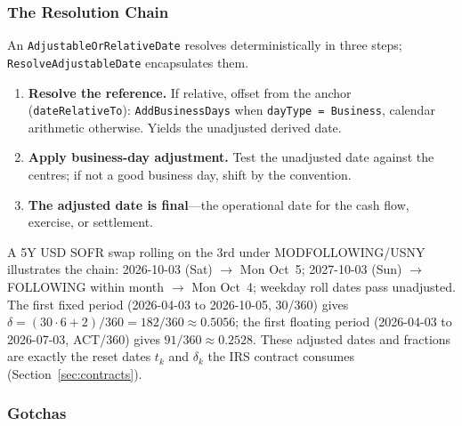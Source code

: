 \documentclass[11pt,a4paper]{article}
\begin{document}
\subsubsection{The Resolution Chain}
\label{sec:cdm-date-resolution}

An \texttt{AdjustableOrRelativeDate} resolves deterministically in three steps; \texttt{ResolveAdjustableDate} encapsulates them.
\begin{enumerate}[nosep]
\item \textbf{Resolve the reference.} If relative, offset from the anchor (\texttt{date\allowbreak Relative\allowbreak To}): \texttt{Add\allowbreak Business\allowbreak Days} when \texttt{dayType = Business}, calendar arithmetic otherwise. Yields the unadjusted derived date.
\item \textbf{Apply business-day adjustment.} Test the unadjusted date against the centres; if not a good business day, shift by the convention.
\item \textbf{The adjusted date is final}---the operational date for the cash flow, exercise, or settlement.
\end{enumerate}
A 5Y USD SOFR swap rolling on the 3rd under MODFOLLOWING/USNY illustrates the chain: 2026-10-03 (Sat) $\to$ Mon Oct~5; 2027-10-03 (Sun) $\to$ FOLLOWING within month $\to$ Mon Oct~4; weekday roll dates pass unadjusted. The first fixed period (2026-04-03 to 2026-10-05, 30/360) gives $\delta=(30\cdot6+2)/360=182/360\approx0.5056$; the first floating period (2026-04-03 to 2026-07-03, ACT/360) gives $91/360\approx0.2528$. These adjusted dates and fractions are exactly the reset dates $t_k$ and $\delta_k$ the IRS contract consumes (Section~\ref{sec:contracts}).

\subsubsection{Gotchas}
\label{sec:cdm-date-gotchas}
\end{document}

